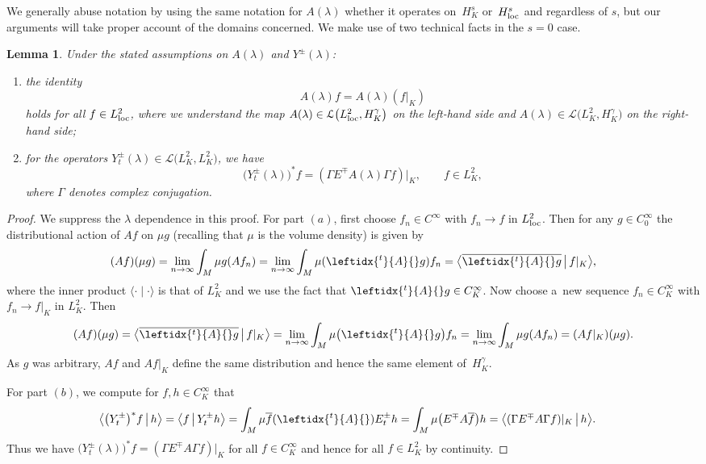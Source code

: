 \documentclass[pdftex]{sigma}
\numberwithin{equation}{section}
\newtheorem{Lemma}[Theorem]{Lemma}
\newcommand{\LL}{{\mathcal L}}
\newcommand{\ip}[2]{{\big\langle #1 \, \big|\, #2\big\rangle}}
\newcommand{\loc}{{\rm loc}}
\newcommand{\adj}[1]{\leftidx{^{t}}{#1}{}}
\begin{document}
 We generally abuse notation by using the same notation for $A(\lambda)$ whether it operates on~$H^s_K$ or~$H^s_\loc$ and regardless of $s$, but our arguments will take proper account of the domains concerned.
 We make use of two technical facts in the $s=0$ case.
 \begin{Lemma}\label{lem:tech}
 	Under the stated assumptions on $A(\lambda)$ and $Y^\pm(\lambda)$:
 \begin{enumerate}\itemsep=0pt
 \item[$(a)$] the identity
 	\begin{equation*}
 		A(\lambda)f = A(\lambda)(f|_K)
 	\end{equation*}
 	holds for all $f\in L^2_\loc$, where we understand the map $A(\lambda)\in \LL\big(L^2_\loc,H^\gamma_K\big)$ on the left-hand side and $A(\lambda)\in \LL\big(L^2_K,H^\gamma_K\big)$ on the right-hand side;
 \item[$(b)$]
 	for the operators $Y_t^\pm(\lambda)\in \LL\big(L^2_K,L^2_K\big)$, we have
 	\begin{equation*}
 		\big(Y_t^\pm(\lambda)\big)^*f = (\Gamma E^\mp A(\lambda)\Gamma f )|_K, \qquad f\in L^2_K,
 	\end{equation*}
 	where $\Gamma$ denotes complex conjugation.
 \end{enumerate}
 \end{Lemma}	
 \begin{proof}
 	We suppress the $\lambda$ dependence in this proof. For part $(a)$,
 	first choose $f_n\in C^\infty$ with $f_n\to f$ in $L^2_\loc$. Then for any
 	$g\in C_0^\infty$ the distributional action of $Af$ on $\mu g$ (recalling that $\mu$ is the volume density) is given by
 	\begin{equation*}
 		(Af)(\mu g)=\lim_{n\to\infty} \int_M \mu g (Af_n) =
 		\lim_{n\to\infty}\int_M \mu (\adj{A}g) f_n = \ip{\overline{\adj{A}g}}{f|_K},
 	\end{equation*}
 	where the inner product $\langle\cdot\mid\cdot\rangle$ is that of $L^2_K$ and we use the fact that $\adj{A}g\in C^\infty_K$. Now choose a~new sequence $f_n\in C^\infty_K$ with $f_n\to f|_K$ in $L^2_K$. Then
 	\begin{equation*}
 		(Af)(\mu g)= \ip{\overline{\adj{A}g}}{f|_K}=\lim_{n\to\infty}
 		\int_M \mu \big(\adj{A}g\big)f_n = \lim_{n\to\infty} \int_M \mu g(Af_n) = (Af|_K)(\mu g).
 	\end{equation*}
 	As $g$ was arbitrary, $Af$ and $Af|_K$ define the same distribution and hence the same element of~$H^\gamma_K$.
 	
 	For part $(b)$, we compute for $f,h\in C^\infty_K$ that
 	\begin{align*}
 		\ip{\big(Y_t^\pm\big)^*f}{h} &= \ip{f}{Y_t^\pm h}
 		= \int_M\mu \overline{f} (
 		\adj{A}) E_t^\pm h = \int_M\mu \big(E^\mp A \overline{f} \big) h = \ip{(\Gamma E^\mp A \Gamma f)|_K}{h}.
 	\end{align*}
 	Thus we have $\big(Y_t^\pm(\lambda)\big)^*f = (\Gamma E^\mp A \Gamma f)|_K$ for
 	all $f\in C^\infty_K$ and hence for all $f\in L^2_K$ by continuity.
 \end{proof}
\end{document}
